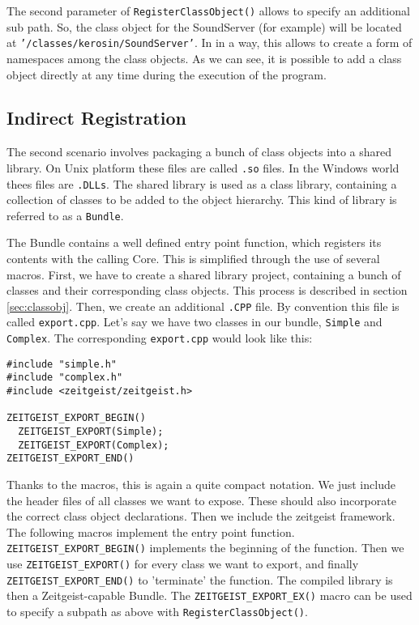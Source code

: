 The second parameter of \texttt{RegisterClassObject()} allows to
specify an additional sub path. So, the class object for the
SoundServer (for example) will be located at
\texttt{'/classes/kerosin/SoundServer'}. In in a way, this allows to create a
form of namespaces among the class objects. As we can see, it is
possible to add a class object directly at any time during the
execution of the program.

\subsection{Indirect Registration}

The second scenario involves packaging a bunch of class objects into a
shared library. On Unix platform these files are called \texttt{.so}
files. In the Windows world thees files are \texttt{.DLLs}. The shared
library is used as a class library, containing a collection of classes
to be added to the object hierarchy. This kind of library is referred
to as a \texttt{Bundle}. 

The Bundle contains a well defined entry point function, which
registers its contents with the calling Core. This is simplified
through the use of several macros. First, we have to create a shared
library project, containing a bunch of classes and their corresponding
class objects. This process is described in section
\ref{sec:classobj}. Then, we create an additional \texttt{.CPP} file. By convention
this file is called \texttt{export.cpp}. Let's say we have two classes
in our bundle, \texttt{Simple} and \texttt{Complex}. The corresponding
\texttt{export.cpp} would look like this:

\begin{verbatim}
#include "simple.h"
#include "complex.h"
#include <zeitgeist/zeitgeist.h>

ZEITGEIST_EXPORT_BEGIN()
  ZEITGEIST_EXPORT(Simple);
  ZEITGEIST_EXPORT(Complex);
ZEITGEIST_EXPORT_END()
\end{verbatim}


Thanks to the macros, this is again a quite compact notation. We just
include the header files of all classes we want to expose. These
should also incorporate the correct class object declarations. Then we
include the zeitgeist framework. The following macros implement the
entry point function. \texttt{ZEITGEIST\_EXPORT\_BEGIN()} implements
the beginning of the function. Then we use
\texttt{ZEITGEIST\_EXPORT()} for every class we want to export, and
finally \texttt{ZEITGEIST\_EXPORT\_END()} to 'terminate' the
function. The compiled library is then a Zeitgeist-capable Bundle. The
\texttt{ZEITGEIST\_EXPORT\_EX()} macro can be used to specify a subpath as above
with \texttt{RegisterClassObject()}.


